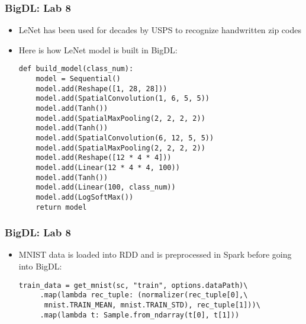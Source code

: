 \begin{frame}[fragile]
  \frametitle{BigDL: Lab 8}
  \begin{itemize}
  \item LeNet has been used for decades by USPS to recognize handwritten zip codes
  \item Here is how LeNet model is built in BigDL:
{\small
    {\color{mycolorcode}
\begin{verbatim}
def build_model(class_num):
    model = Sequential()
    model.add(Reshape([1, 28, 28]))
    model.add(SpatialConvolution(1, 6, 5, 5))
    model.add(Tanh())
    model.add(SpatialMaxPooling(2, 2, 2, 2))
    model.add(Tanh())
    model.add(SpatialConvolution(6, 12, 5, 5))
    model.add(SpatialMaxPooling(2, 2, 2, 2))
    model.add(Reshape([12 * 4 * 4]))
    model.add(Linear(12 * 4 * 4, 100))
    model.add(Tanh())
    model.add(Linear(100, class_num))
    model.add(LogSoftMax())
    return model
\end{verbatim}
    }
}
\end{itemize}
\end{frame}


\begin{frame}[fragile]
  \frametitle{BigDL: Lab 8}
  \begin{itemize}
  \item MNIST data is loaded into RDD and is preprocessed in Spark before going into BigDL:
{\small
    {\color{mycolorcode}
\begin{verbatim}
train_data = get_mnist(sc, "train", options.dataPath)\
     .map(lambda rec_tuple: (normalizer(rec_tuple[0],\
      mnist.TRAIN_MEAN, mnist.TRAIN_STD), rec_tuple[1]))\
     .map(lambda t: Sample.from_ndarray(t[0], t[1]))
\end{verbatim}
}
}
\end{itemize}
\end{frame}


